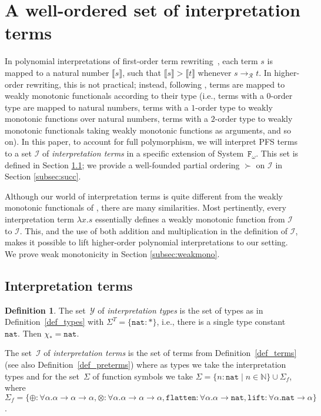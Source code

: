 \documentclass[a4paper,UKenglish,cleveref,autoref,numberwithinsect]{lipics-v2019}
\theoremstyle{definition}
\newtheorem{defn}[theorem]{Definition}
\newcommand{\Fomega}{\mathtt{F}_\omega}
\newcommand{\Rules}{\mathcal{R}}
\newcommand{\Iterms}{\mathcal{I}}
\newcommand{\ITypes}{\mathcal{Y}}
\newcommand{\arrtype}{\rightarrow}
\newcommand{\abs}[2]{\lambda #1.#2}
\newcommand{\arr}[1]{\longrightarrow_{#1}}
\newcommand{\nat}{\mathtt{nat}}
\newcommand{\flatten}{\mathtt{flatten}}
\newcommand{\lift}{\mathtt{lift}}
\newcommand{\interpret}[1]{\llbracket #1 \rrbracket}
\newcommand{\Nbb}{\mathbb{N}}
\begin{document}
\section{A well-ordered set of interpretation terms}\label{sec:World}

In polynomial interpretations of first-order term
rewriting~\cite[Chapter 6.2]{Terese2003}, each term $s$ is mapped to a
natural number $\interpret{s}$, such that $\interpret{s} > \interpret{t}$
whenever $s \arr{\Rules} t$.  In higher-order rewriting, this is not
practical; instead, following \cite{pol:96}, terms are mapped to weakly
monotonic functionals according to their type (i.e., terms with a $0$-order
type are mapped to natural numbers, terms with a $1$-order type to weakly
monotonic functions over natural numbers, terms with a $2$-order type to
weakly monotonic functionals taking weakly monotonic functions as
arguments, and so on).  In this paper, to account for full polymorphism,
we will interpret PFS terms to a set $\Iterms$ of \emph{interpretation terms}
in a specific extension of System~$\Fomega$.  This set is defined in Section
\ref{subsec:I}; we provide a well-founded partial ordering $\succ$ on
$\Iterms$ in Section \ref{subsec:succ}.

Although our world of interpretation terms is quite different
from the weakly monotonic functionals of \cite{pol:96}, there are many
similarities.  Most pertinently, every interpretation term $\abs{x}{s}$
essentially defines a weakly monotonic function from $\Iterms$ to
$\Iterms$.  This, and the use of both addition and multiplication in
the definition of $\Iterms$, makes it possible to lift higher-order
polynomial interpretations \cite{FuhsKop2012} to our setting.  We
prove weak monotonicity in Section \ref{subsec:weakmono}.

\subsection{Interpretation terms}\label{subsec:I}

\begin{defn}\label{def_iterms}
  The set~$\ITypes$ of \emph{interpretation types} is the set of types
  as in Definition~\ref{def_types} with $\Sigma^T = \{ \nat : * \}$,
  i.e., there is a single type constant~$\nat$. Then $\chi_* = \nat$.

  The set~$\Iterms$ of \emph{interpretation terms} is the set of terms
  from Definition~\ref{def_terms} (see also
  Definition~\ref{def_preterms}) where as types we take the
  interpretation types and for the set~$\Sigma$ of function symbols we
  take $\Sigma = \{ n : \nat \mid n \in \Nbb \} \cup \Sigma_f$, where
  $ \Sigma_f = \{ \oplus : \forall \alpha . \alpha \arrtype \alpha
  \arrtype \alpha, \otimes : \forall \alpha . \alpha \arrtype \alpha
  \arrtype \alpha, \flatten : \forall \alpha . \alpha \arrtype \nat,
  \lift : \forall \alpha . \nat \arrtype \alpha \} $.
\end{defn}
\end{document}
